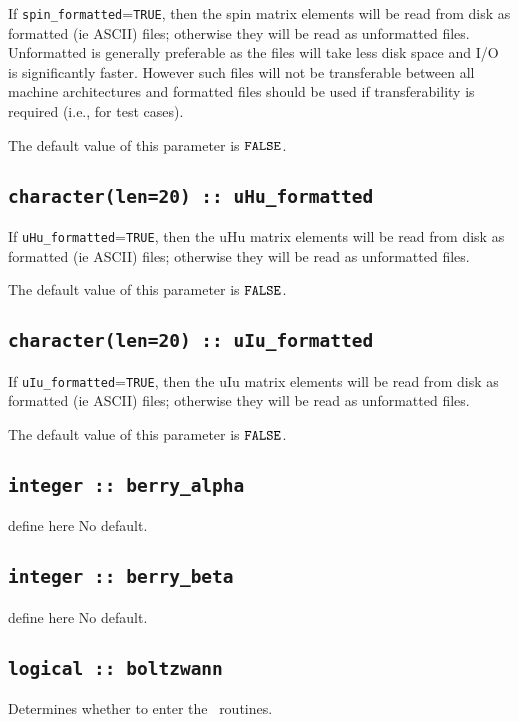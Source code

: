 If \verb#spin_formatted#=\verb#TRUE#, then the spin matrix elements will be
read from disk as formatted (ie ASCII) files; otherwise they will be
read as unformatted files. Unformatted is generally preferable as the
files will take less disk space and I/O is significantly
faster. However such files will not be transferable between all
machine architectures and formatted files should be used if
transferability is required (i.e., for test cases).

The default value of this parameter is $\verb#FALSE#$.

\subsection[uHu\_formated]{\tt character(len=20) :: uHu\_formatted}

If \verb#uHu_formatted#=\verb#TRUE#, then the uHu matrix elements will be
read from disk as formatted (ie ASCII) files; otherwise they will be
read as unformatted files.

The default value of this parameter is $\verb#FALSE#$.

\subsection[uIu\_formated]{\tt character(len=20) :: uIu\_formatted}

If \verb#uIu_formatted#=\verb#TRUE#, then the uIu matrix elements will be
read from disk as formatted (ie ASCII) files; otherwise they will be
read as unformatted files.

The default value of this parameter is $\verb#FALSE#$.

\subsection[berry\_alpha]{\tt integer :: berry\_alpha}
define here
No default.

\subsection[berry\_alpha]{\tt integer :: berry\_beta}
define here
No default.




\clearpage
\subsection[boltzwann]{\tt logical :: boltzwann}
Determines whether to enter the \bw\ routines.

